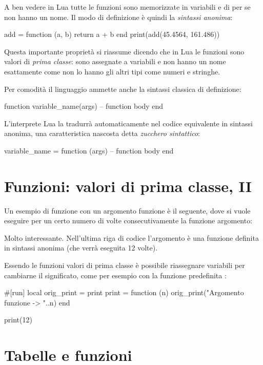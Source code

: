A ben vedere in Lua tutte le funzioni sono memorizzate in variabili e di per se
non hanno un nome. Il modo di definizione è quindi la \emph{sintassi anonima}:
\begin{lines}
add = function (a, b)
    return a + b
end
print(add(45.4564, 161.486))
\end{lines}

Questa importante proprietà si riassume dicendo che in Lua le funzioni sono
valori di \emph{prima classe}: sono assegnate a variabili e non hanno un nome
esattamente come non lo hanno gli altri tipi come numeri e stringhe.

Per comodità il linguaggio ammette anche la sintassi classica di definizione:
\begin{lines}
function variable_name(args)
    -- function body
end
\end{lines}
L'interprete Lua la tradurrà automaticamente nel codice equivalente in sintassi
anonima, una caratteristica nascosta detta \emph{zucchero sintattico}:
\begin{lines}
variable_name = function (args)
    -- function body
end
\end{lines}


\section{Funzioni: valori di prima classe, II}

Un esempio di funzione con un argomento funzione è il seguente, dove si vuole
eseguire per un certo numero di volte consecutivamente la funzione argomento:

Molto interessante. Nell'ultima riga di codice l'argomento è una funzione
definita in sintassi anonima (che verrà eseguita 12 volte).

Essendo le funzioni valori di prima classe è possibile riassegnare variabili per
cambiarne il significato, come per esempio con la funzione predefinita
:
\begin{lines}
#[run]
local orig_print = print
print = function (n)
    orig_print("Argomento funzione -> "..n)
end

print(12)
\end{lines}


\section{Tabelle e funzioni}

